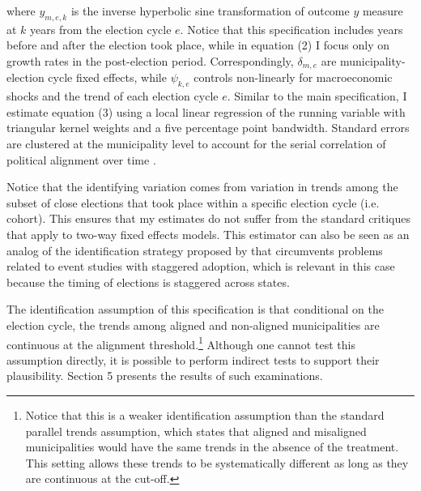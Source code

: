 \documentclass[dv_diss_main.tex]{subfiles}
\begin{document}
\noindent where  $y_{m,e,k}$ is the inverse hyperbolic sine transformation of outcome $y$ measure at $k$ years from the election cycle $e$. Notice that this specification includes years before and after the election took place, while in equation (2) I focus only on growth rates in the post-election period.  
Correspondingly, $\delta_{m,e}$ are municipality-election cycle fixed effects, while $\psi_{k,e}$ controls non-linearly for macroeconomic shocks and the trend of each election cycle $e$. Similar to the main specification, I estimate equation (3) using a local linear regression of the running variable with triangular kernel weights and a five percentage point bandwidth. Standard errors are clustered at the municipality level to account for the serial correlation of political alignment over time \citep{bertrand2004much}. 

Notice that the identifying variation comes from variation in trends among the subset of close elections that took place within a specific election cycle (i.e. cohort). This ensures that my estimates do not suffer from the standard critiques that apply to two-way fixed effects models. This estimator can also be seen as an analog of the identification strategy proposed by \citep{cengiz2019effect} that circumvents problems related to event studies with staggered adoption, which is relevant in this case because the timing of elections is staggered across states. 



The identification assumption of this specification is that conditional on the election cycle, the trends among aligned and non-aligned municipalities are continuous at the alignment threshold.\footnote{Notice that this is a weaker identification assumption than the standard parallel trends assumption, which states that aligned and misaligned municipalities would have the same trends in the absence of the treatment. This setting allows these trends to be systematically different as long as they are continuous at the  cut-off.} Although one cannot test this assumption directly, it is possible to perform indirect tests to support their plausibility. Section 5 presents the results of such examinations. 
\end{document}
